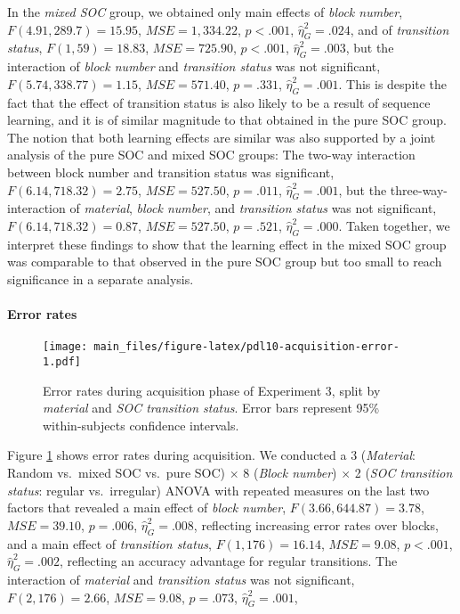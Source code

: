 \documentclass[floatsintext,doc]{apa6}
\theoremstyle{definition}
\theoremstyle{definition}
\theoremstyle{definition}
\theoremstyle{remark}
\begin{document}
In the \emph{mixed SOC} group, we obtained only main effects of
\emph{block number}, \(F(4.91, 289.7) = 15.95\),
\(\mathit{MSE} = 1,334.22\), \(p < .001\), \(\hat{\eta}^2_G = .024\),
and of \emph{transition status}, \(F(1, 59) = 18.83\),
\(\mathit{MSE} = 725.90\), \(p < .001\), \(\hat{\eta}^2_G = .003\), but
the interaction of \emph{block number} and \emph{transition status} was
not significant, \(F(5.74, 338.77) = 1.15\), \(\mathit{MSE} = 571.40\),
\(p = .331\), \(\hat{\eta}^2_G = .001\). This is despite the fact that
the effect of transition status is also likely to be a result of
sequence learning, and it is of similar magnitude to that obtained in
the pure SOC group. The notion that both learning effects are similar
was also supported by a joint analysis of the pure SOC and mixed SOC
groups: The two-way interaction between block number and transition
status was significant, \(F(6.14, 718.32) = 2.75\),
\(\mathit{MSE} = 527.50\), \(p = .011\), \(\hat{\eta}^2_G = .001\), but
the three-way-interaction of \emph{material}, \emph{block number}, and
\emph{transition status} was not significant,
\(F(6.14, 718.32) = 0.87\), \(\mathit{MSE} = 527.50\), \(p = .521\),
\(\hat{\eta}^2_G = .000\). Taken together, we interpret these findings
to show that the learning effect in the mixed SOC group was comparable
to that observed in the pure SOC group but too small to reach
significance in a separate analysis.

\paragraph{Error rates}\label{error-rates-2}

\begin{figure}
\centering
\texttt{[image: main\_files/figure-latex/pdl10-acquisition-error-1.pdf]}
\caption{\label{fig:pdl10-acquisition-error}Error rates during acquisition
phase of Experiment 3, split by \emph{material} and \emph{SOC transition
status}. Error bars represent 95\% within-subjects confidence
intervals.}
\end{figure}

Figure \ref{fig:pdl10-acquisition-error} shows error rates during
acquisition. We conducted a 3 (\emph{Material}: Random vs.~mixed SOC
vs.~pure SOC) \(\times\) 8 (\emph{Block number}) \(\times\) 2 (\emph{SOC
transition status}: regular vs.~irregular) ANOVA with repeated measures
on the last two factors that revealed a main effect of \emph{block
number}, \(F(3.66, 644.87) = 3.78\), \(\mathit{MSE} = 39.10\),
\(p = .006\), \(\hat{\eta}^2_G = .008\), reflecting increasing error
rates over blocks, and a main effect of \emph{transition status},
\(F(1, 176) = 16.14\), \(\mathit{MSE} = 9.08\), \(p < .001\),
\(\hat{\eta}^2_G = .002\), reflecting an accuracy advantage for regular
transitions. The interaction of \emph{material} and \emph{transition
status} was not significant, \(F(2, 176) = 2.66\),
\(\mathit{MSE} = 9.08\), \(p = .073\), \(\hat{\eta}^2_G = .001\),
\end{document}

